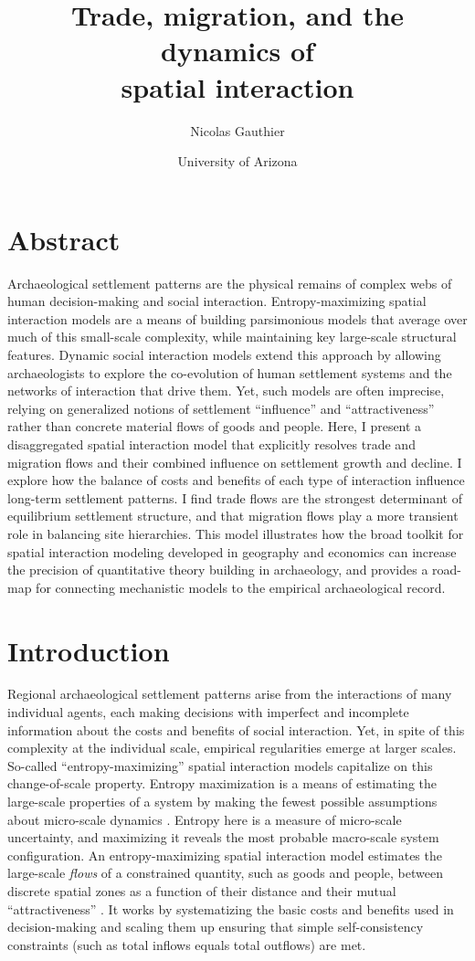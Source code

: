 \documentclass{article}
\title{Trade, migration, and the dynamics of\\ spatial interaction}
\author{Nicolas Gauthier}
\date{\small{University of Arizona}}
\begin{document}
\maketitle

\section*{Abstract}
Archaeological settlement patterns are the physical remains of complex webs of human decision-making and social interaction. Entropy-maximizing spatial interaction models are a means of building parsimonious models that average over much of this small-scale complexity, while maintaining key large-scale structural features. Dynamic social interaction models extend this approach by allowing archaeologists to explore the co-evolution of human settlement systems and the networks of interaction that drive them. Yet, such models are often imprecise, relying on generalized notions of settlement ``influence'' and ``attractiveness'' rather than concrete material flows of goods and people. Here, I present a disaggregated spatial interaction model that explicitly resolves trade and migration flows and their combined influence on settlement growth and decline. I explore how the balance of costs and benefits of each type of interaction influence long-term settlement patterns. I find trade flows are the strongest determinant of equilibrium settlement structure, and that migration flows play a more transient role in balancing site hierarchies. This model illustrates how the broad toolkit for spatial interaction modeling developed in geography and economics can increase the precision of quantitative theory building in archaeology, and provides a road-map for connecting mechanistic models to the empirical archaeological record.

\section{Introduction}

Regional archaeological settlement patterns arise from the interactions of many individual agents, each making decisions with imperfect and incomplete information about the costs and benefits of social interaction. Yet, in spite of this complexity at the individual scale, empirical regularities emerge at larger scales. So-called ``entropy-maximizing'' spatial interaction models capitalize on this change-of-scale property. Entropy maximization is a means of estimating the large-scale properties of a system by making the fewest possible assumptions about micro-scale dynamics \parencite{Presse2013, Thurner2017ThePrinciple}. Entropy here is a measure of micro-scale uncertainty, and maximizing it reveals the most probable macro-scale system configuration. An entropy-maximizing spatial interaction model estimates the large-scale \emph{flows} of a constrained quantity, such as goods and people, between discrete spatial zones as a function of their distance and their mutual ``attractiveness'' \parencite{Wilson1971a}. It works by systematizing the basic costs and benefits used in decision-making and scaling them up ensuring that simple self-consistency constraints (such as total inflows equals total outflows) are met. 
\end{document}
